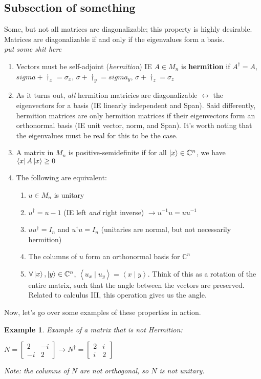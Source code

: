\documentclass[12pt]{article}
\theoremstyle{plain}
\theoremstyle{nonumberplain}
\theoremstyle{plain}
\newtheorem{example}[lemma]{Example}
\theoremstyle{nonumberplain}
\newcommand\1{{\bf 1}}
\newcommand{\bmat}[1]{\begin{bmatrix*} #1 \end{bmatrix*}} %
\newcommand{\C}{\mathbb{C}} %
\newcommand{\<}{\left\langle}
\renewcommand{\>}{\right\rangle}
\newcommand{\inp}[2]{\left\langle#1\mid #2\right\rangle} %
\begin{document}
\subsection{Subsection of something}
Some, but not all matrices are diagonalizable; this property is highly desirable. Matrices are diagonalizable if and only if the eigenvalues form a basis. \\ \textit{put some shit here} \\
\begin{enumerate}
\item Vectors must be self-adjoint (\textit{hermition}) IE $A\in M_n$ is \textbf{hermition} if $A^\dagger=A$, $sigma+\dagger_x=\sigma_x$, $\sigma+\dagger_y=sigma_y$, $\sigma+\dagger_z=\sigma_z$
\item As it turns out, \textit{all} hermition matricies are diagonalizable $\longleftrightarrow$ the eigenvectors for a basis (IE linearly independent and Span). Said differently, hermition matrices are only hermition matrices if their eigenvectors form an orthonormal basis (IE unit vector, norm, and Span). It's worth noting that the eigenvalues must be real for this to be the case.
\item A matrix in $M_n$ is positive-semidefinite if for all $\ket{x}\in\C^n$, we have $\bra{x}A\ket{x}\geq0$
\item The following are equivalent:
\begin{enumerate}
\item $u\in M_n$ is unitary
\item $u^\dagger=u-1$ (IE left \textit{and} right inverse) $\longrightarrow u^{-1}u=uu^{-1}$
\item $uu^\dagger=I_n$ and $u^\dagger u=I_n$ (unitaries are normal, but not necessarily hermition)
\item The columns of $u$ form an orthonormal basis for $\C^n$
\item $\forall\ket{x},\ket{y}\in\C^n$, $\inp{u_x}{u_y}=\inp{x}{y}$. Think of this as a rotation of the entire matrix, such that the angle between the vectors are preserved. Related to calculus III, this operation gives us the angle.
\end{enumerate}
\end{enumerate}
Now, let's go over some examples of these properties in action.
\begin{example}
Example of a matrix that is \textit{not} Hermition:
\begin{center}
$N=\bmat{2 & -i \\ -i & 2}\longrightarrow N^\dagger=\bmat{2 & i \\ i & 2}$
\end{center} Note: the columns of $N$ are not orthogonal, so $N$ is not unitary.
\end{example}
\end{document}
